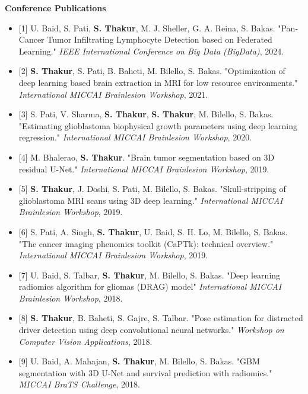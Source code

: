 \documentclass[letterpaper,11pt]{article}
\newcommand{\resumeItem}[1]{
  \item\small{
    {#1 \vspace{-2pt}}
  }
}
\newcommand{\resumeItemListStart}{\begin{itemize}}
\newcommand{\resumeItemListEnd}{\end{itemize}\vspace{-5pt}}
\begin{document}
    \item\small{\textbf{Conference Publications}}
      \resumeItemListStart
        \resumeItem{[1] U. Baid, S. Pati, \textbf{S. Thakur}, M. J. Sheller, G. A. Reina, S. Bakas. "Pan-Cancer Tumor Infiltrating Lymphocyte Detection based on Federated Learning." \textit{IEEE International Conference on Big Data (BigData)}, 2024.}
        \resumeItem{[2] \textbf{S. Thakur}, S. Pati, B. Baheti, M. Bilello, S. Bakas. "Optimization of deep learning based brain extraction in MRI for low resource environments." \textit{International MICCAI Brainlesion Workshop}, 2021.}
        \resumeItem{[3] S. Pati, V. Sharma, \textbf{S. Thakur}, \textbf{S. Thakur}, M. Bilello, S. Bakas. "Estimating glioblastoma biophysical growth parameters using deep learning regression." \textit{International MICCAI Brainlesion Workshop}, 2020.}
        \resumeItem{[4] M. Bhalerao, \textbf{S. Thakur}. "Brain tumor segmentation based on 3D residual U-Net." \textit{International MICCAI Brainlesion Workshop}, 2019.}
        \resumeItem{[5] \textbf{S. Thakur}, J. Doshi, S. Pati, M. Bilello, S. Bakas. "Skull-stripping of glioblastoma MRI scans using 3D deep learning." \textit{International MICCAI Brainlesion Workshop}, 2019.}
        \resumeItem{[6] S. Pati, A. Singh, \textbf{S. Thakur}, U. Baid, S. H. Lo, M. Bilello, S. Bakas. "The cancer imaging phenomics toolkit (CaPTk): technical overview." \textit{International MICCAI Brainlesion Workshop}, 2019.}
        \resumeItem{[7] U. Baid, S. Talbar, \textbf{S. Thakur}, M. Bilello, S. Bakas. "Deep learning radiomics algorithm for gliomas (DRAG) model" \textit{International MICCAI Brainlesion Workshop}, 2018.}
        \resumeItem{[8] \textbf{S. Thakur}, B. Baheti, S. Gajre, S. Talbar. "Pose estimation for distracted driver detection using deep convolutional neural networks." \textit{Workshop on Computer Vision Applications}, 2018.}
        \resumeItem{[9] U. Baid, A. Mahajan, \textbf{S. Thakur}, M. Bilello, S. Bakas. "GBM segmentation with 3D U-Net and survival prediction with radiomics." \textit{MICCAI BraTS Challenge}, 2018.}
      \resumeItemListEnd
      
\end{document}
